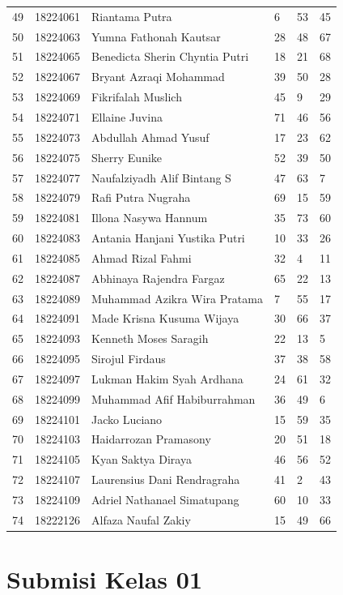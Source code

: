 \documentclass[
  letterpaper,
  DIV=11,
  numbers=noendperiod]{scrreprt}
\begin{document}
\begin{longtable}[]{@{}llllll@{}}
49 & 18224061 & Riantama Putra & 6 & 53 & 45 \\
50 & 18224063 & Yumna Fathonah Kautsar & 28 & 48 & 67 \\
51 & 18224065 & Benedicta Sherin Chyntia Putri & 18 & 21 & 68 \\
52 & 18224067 & Bryant Azraqi Mohammad & 39 & 50 & 28 \\
53 & 18224069 & Fikrifalah Muslich & 45 & 9 & 29 \\
54 & 18224071 & Ellaine Juvina & 71 & 46 & 56 \\
55 & 18224073 & Abdullah Ahmad Yusuf & 17 & 23 & 62 \\
56 & 18224075 & Sherry Eunike & 52 & 39 & 50 \\
57 & 18224077 & Naufalziyadh Alif Bintang S & 47 & 63 & 7 \\
58 & 18224079 & Rafi Putra Nugraha & 69 & 15 & 59 \\
59 & 18224081 & Illona Nasywa Hannum & 35 & 73 & 60 \\
60 & 18224083 & Antania Hanjani Yustika Putri & 10 & 33 & 26 \\
61 & 18224085 & Ahmad Rizal Fahmi & 32 & 4 & 11 \\
62 & 18224087 & Abhinaya Rajendra Fargaz & 65 & 22 & 13 \\
63 & 18224089 & Muhammad Azikra Wira Pratama & 7 & 55 & 17 \\
64 & 18224091 & Made Krisna Kusuma Wijaya & 30 & 66 & 37 \\
65 & 18224093 & Kenneth Moses Saragih & 22 & 13 & 5 \\
66 & 18224095 & Sirojul Firdaus & 37 & 38 & 58 \\
67 & 18224097 & Lukman Hakim Syah Ardhana & 24 & 61 & 32 \\
68 & 18224099 & Muhammad Afif Habiburrahman & 36 & 49 & 6 \\
69 & 18224101 & Jacko Luciano & 15 & 59 & 35 \\
70 & 18224103 & Haidarrozan Pramasony & 20 & 51 & 18 \\
71 & 18224105 & Kyan Saktya Diraya & 46 & 56 & 52 \\
72 & 18224107 & Laurensius Dani Rendragraha & 41 & 2 & 43 \\
73 & 18224109 & Adriel Nathanael Simatupang & 60 & 10 & 33 \\
74 & 18222126 & Alfaza Naufal Zakiy & 15 & 49 & 66 \\
\end{longtable}

\section*{Submisi Kelas 01}\label{submisi-kelas-01}
\end{document}
